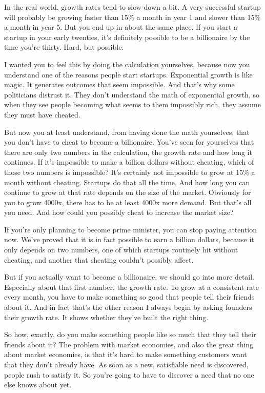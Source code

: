 In the real world, growth rates tend to slow down a bit. A very
successful startup will probably be growing faster than 15\% a month in
year 1 and slower than 15\% a month in year 5. But you end up in about
the same place. If you start a startup in your early twenties, it's
definitely possible to be a billionaire by the time you're thirty. Hard,
but possible.

I wanted you to feel this by doing the calculation yourselves, because
now you understand one of the reasons people start startups. Exponential
growth is like magic. It generates outcomes that seem impossible. And
that's why some politicians distrust it. They don't understand the math
of exponential growth, so when they see people becoming what seems to
them impossibly rich, they assume they must have cheated.

But now you at least understand, from having done the math yourselves,
that you don't have to cheat to become a billionaire. You've seen for
yourselves that there are only two numbers in the calculation, the
growth rate and how long it continues. If it's impossible to make a
billion dollars without cheating, which of those two numbers is
impossible? It's certainly not impossible to grow at 15\% a month
without cheating. Startups do that all the time. And how long you can
continue to grow at that rate depends on the size of the market.
Obviously for you to grow 4000x, there has to be at least 4000x more
demand. But that's all you need. And how could you possibly cheat to
increase the market size?

If you're only planning to become prime minister, you can stop paying
attention now. We've proved that it is in fact possible to earn a
billion dollars, because it only depends on two numbers, one of which
startups routinely hit without cheating, and another that cheating
couldn't possibly affect.

But if you actually want to become a billionaire, we should go into more
detail. Especially about that first number, the growth rate. To grow at
a consistent rate every month, you have to make something so good that
people tell their friends about it. And in fact that's the other reason
I always begin by asking founders their growth rate. It shows whether
they've built the right thing.

So how, exactly, do you make something people like so much that they
tell their friends about it? The problem with market economies, and also
the great thing about market economies, is that it's hard to make
something customers want that they don't already have. As soon as a new,
satisfiable need is discovered, people rush to satisfy it. So you're
going to have to discover a need that no one else knows about yet.

